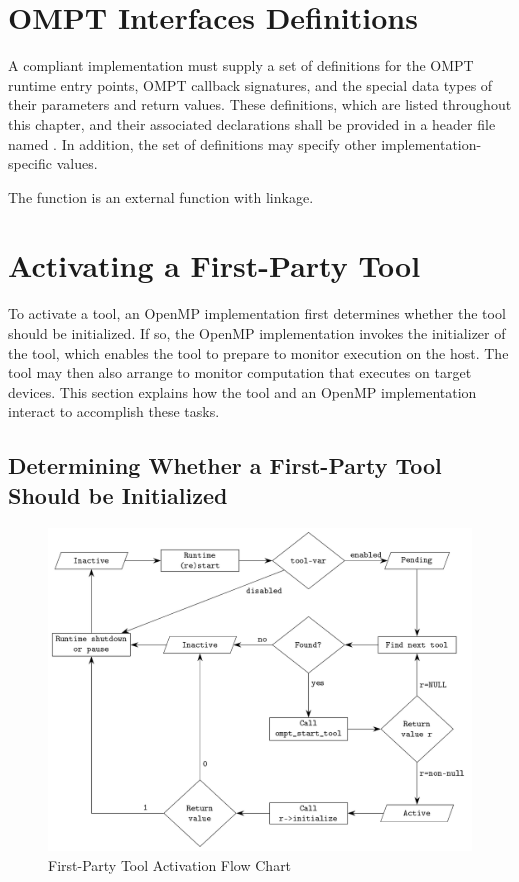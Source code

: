 \section{OMPT Interfaces Definitions}
\label{sec:OMPT Interfaces Definitions}

\begin{ccppspecific}
A compliant implementation must supply a set of definitions for the OMPT runtime
entry points, OMPT callback signatures, and the special data types of
their parameters and return values. These definitions, which are listed throughout
this chapter, and their associated declarations shall be provided in a header file
named . In addition, the set of definitions may specify other
implementation-specific values.

The  function is an external function with  linkage.
\end{ccppspecific}

\section{Activating a First-Party Tool}
\label{sec:ompt-initialization}

To activate a tool, an OpenMP implementation first determines whether 
the tool should be initialized. If so, the OpenMP implementation invokes 
the initializer of the tool, which enables the tool to prepare to monitor 
execution on the host. The tool may then also arrange to monitor computation 
that executes on target devices. This section explains how the tool and an
OpenMP implementation interact to accomplish these tasks.





\subsection{Determining Whether a First-Party Tool Should be Initialized}
\label{sec:ompt-check-tool}

\begin{figure}[h]
  \centering
  \includegraphics[width=.9\linewidth]{tool_support/ompt_flow_chart.pdf}
  \caption{First-Party Tool Activation Flow Chart}
  \label{fig:ompt_diagram}
\end{figure}

